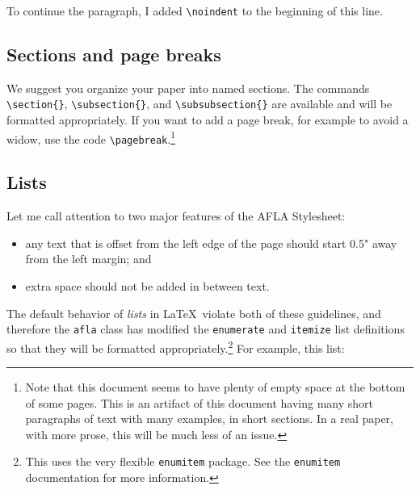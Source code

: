 \documentclass{afla}
\begin{document}
\noindent To continue the paragraph, I added \verb`\noindent` to the beginning of this line.

\subsection{Sections and page breaks}

We suggest you organize your paper into named sections. The commands \verb`\section{}`, \linebreak \verb`\subsection{}`, and \verb`\subsubsection{}` are available and will be formatted appropriately. If you want to add a page break, for example to avoid a widow, use the code \verb`\pagebreak`.\footnote{Note that this document seems to have plenty of empty space at the bottom of some pages. This is an artifact of this document having many short paragraphs of text with many examples, in short sections. In a real paper, with more prose, this will be much less of an issue.}

\subsection{Lists}

Let me call attention to two major features of the AFLA Stylesheet:

\begin{itemize}
\item any text that is offset from the left edge of the page should start 0.5" away from the left margin; and
\item extra space should not be added in between text.
\end{itemize}

\noindent The default behavior of \textit{lists} in \LaTeX\ violate both of these guidelines, and therefore the \verb`afla` class has modified the \verb`enumerate` and \verb`itemize` list definitions so that they will be formatted appropriately.\footnote{This uses the very flexible \texttt{enumitem} package. See the \texttt{enumitem} documentation for more information.} For example, this list:
\end{document}
